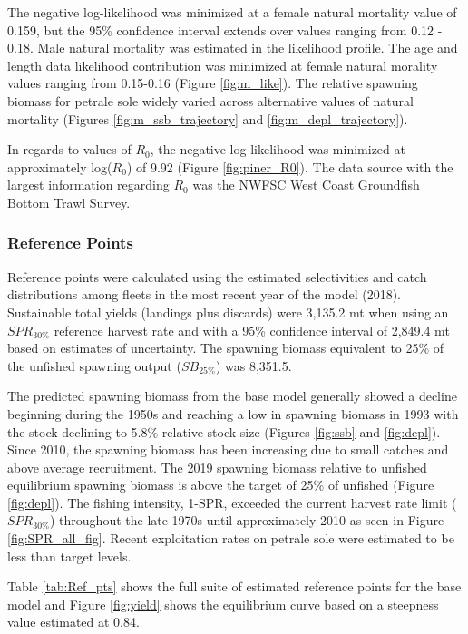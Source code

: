 \documentclass[12pt,]{article}
\begin{document}
The negative log-likelihood was minimized at a female natural mortality
value of 0.159, but the 95\% confidence interval extends over values
ranging from 0.12 - 0.18. Male natural mortality was estimated in the
likelihood profile. The age and length data likelihood contribution was
minimized at female natural morality values ranging from 0.15-0.16
(Figure \ref{fig:m_like}). The relative spawning biomass for petrale
sole widely varied across alternative values of natural mortality
(Figures \ref{fig:m_ssb_trajectory} and \ref{fig:m_depl_trajectory}).

In regards to values of \(R_0\), the negative log-likelihood was
minimized at approximately log(\(R_0\)) of 9.92 (Figure
\ref{fig:piner_R0}). The data source with the largest information
regarding \(R_0\) was the NWFSC West Coast Groundfish Bottom Trawl
Survey.

\subsubsection{Reference Points}\label{reference-points-1}

Reference points were calculated using the estimated selectivities and
catch distributions among fleets in the most recent year of the model
(2018). Sustainable total yields (landings plus discards) were 3,135.2
mt when using an \(SPR_{30\%}\) reference harvest rate and with a 95\%
confidence interval of 2,849.4 mt based on estimates of uncertainty. The
spawning biomass equivalent to 25\% of the unfished spawning output
(\(SB_{25\%}\)) was 8,351.5.

The predicted spawning biomass from the base model generally showed a
decline beginning during the 1950s and reaching a low in spawning
biomass in 1993 with the stock declining to 5.8\% relative stock size
(Figures \ref{fig:ssb} and \ref{fig:depl}). Since 2010, the spawning
biomass has been increasing due to small catches and above average
recruitment. The 2019 spawning biomass relative to unfished equilibrium
spawning biomass is above the target of 25\% of unfished (Figure
\ref{fig:depl}). The fishing intensity, 1-SPR, exceeded the current
harvest rate limit (\(SPR_{30\%}\)) throughout the late 1970s until
approximately 2010 as seen in Figure \ref{fig:SPR_all_fig}. Recent
exploitation rates on petrale sole were estimated to be less than target
levels.

Table \ref{tab:Ref_pts} shows the full suite of estimated reference
points for the base model and Figure \ref{fig:yield} shows the
equilibrium curve based on a steepness value estimated at 0.84.
\end{document}
